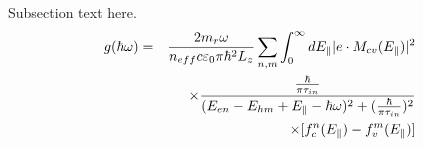 Subsection text here.
\begin{eqnarray}
    g(\hbar\omega) &=& \frac{2 m_r \omega}{n_{eff} c \varepsilon_0 \pi \hbar^2 L_z}
        \sum_{n,m} \int_0^\infty dE_\parallel |e\cdot M_{cv}(E_\parallel)|^2 \notag\\
    && \times \frac{\frac{\hbar}{\pi \tau_{in}}}
        {(E_{en}-E_{hm}+E_\parallel-\hbar\omega)^2+(\frac{\hbar}{\pi \tau_{in}})^2} \notag\\
    && \times [f_c^n(E_\parallel)-f_v^m(E_\parallel)]
\end{eqnarray}
